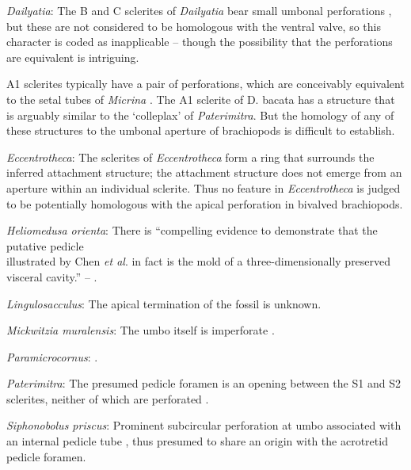 \documentclass[openany]{book}
\begin{document}
\hypertarget{Dailyatia-coding-120}{}
\emph{Dailyatia}: The B and C sclerites of \emph{Dailyatia} bear small
umbonal perforations \citep{Skovsted2015Theearly}, but these are not
considered to be homologous with the ventral valve, so this character is
coded as inapplicable -- though the possibility that the perforations
are equivalent is intriguing.

A1 sclerites typically have a pair of perforations, which are
conceivably equivalent to the setal tubes of \emph{Micrina}
\citep{Holmer2011Firstrecord}. The A1 sclerite of D. bacata has a
structure that is arguably similar to the `colleplax' of
\emph{Paterimitra}. But the homology of any of these structures to the
umbonal aperture of brachiopods is difficult to establish.

\hypertarget{Eccentrotheca-coding-120}{}
\emph{Eccentrotheca}: The sclerites of \emph{Eccentrotheca} form a ring
that surrounds the inferred attachment structure; the attachment
structure does not emerge from an aperture within an individual
sclerite. Thus no feature in \emph{Eccentrotheca} is judged to be
potentially homologous with the apical perforation in bivalved
brachiopods.

\hypertarget{Heliomedusa_orienta-coding-120}{}
\emph{Heliomedusa orienta}: There is ``compelling evidence to
demonstrate that the putative pedicle\\
illustrated by Chen \emph{et al}. \citeyearpar[Figs. 4, 6,
7]{Chen2007Reinterpretationof} in fact is the mold of a
three-dimensionally preserved visceral cavity.'' --
\citet{Zhang2009Architectureand}.

\hypertarget{Lingulosacculus-coding-120}{}
\emph{Lingulosacculus}: The apical termination of the fossil is unknown.

\hypertarget{Mickwitzia_muralensis-coding-120}{}
\emph{Mickwitzia muralensis}: The umbo itself is imperforate
\citep{Balthasar2004Shellstructure}.

\hypertarget{Paramicrocornus-coding-120}{}
\emph{Paramicrocornus}: \citet{Zhang2018Ahyolithid}.

\hypertarget{Paterimitra-coding-120}{}
\emph{Paterimitra}: The presumed pedicle foramen is an opening between
the S1 and S2 sclerites, neither of which are perforated
\citep{Skovsted2009Thescleritome}.

\hypertarget{Siphonobolus_priscus-coding-120}{}
\emph{Siphonobolus priscus}: Prominent subcircular perforation at umbo
associated with an internal pedicle tube \citep{Popov2009Earlyontogeny},
thus presumed to share an origin with the acrotretid pedicle foramen.
\end{document}
